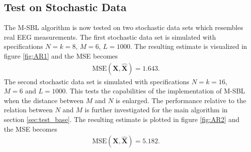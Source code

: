 \subsection{Test on Stochastic Data}\label{sec:testMsbl_stoch}
The M-SBL algorithm is now tested on two stochastic data sets which resembles real EEG measurements. 
The first stochastic data set is simulated with specifications $N = k = 8$, $M = 6$, $L=1000$. 
The resulting estimate is visualized in figure \ref{fig:AR1} and the MSE becomes 
\begin{align*}
\text{MSE}(\mathbf{X}, \hat{\mathbf{X}}) = 1.643.
\end{align*} 
The second stochastic data set is simulated with specifications $N = k =16$, $M = 6$ and $L=1000$. 
This tests the capabilities of the implementation of M-SBL when the distance between $M$ and $N$ is enlarged. 
The performance relative to the relation between $N$ and $M$ is further investigated for the main algorithm in section \ref{sec:test_base}.
The resulting estimate is plotted in figure \ref{fig:AR2} and the MSE becomes 
\begin{align*}
\text{MSE}(\mathbf{X}, \hat{\mathbf{X}}) = 5.182. 
\end{align*}  
